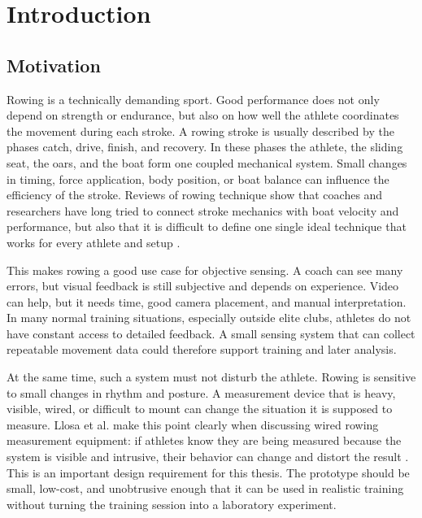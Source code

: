 \chapter{Introduction} %

\section{Motivation}

Rowing is a technically demanding sport. Good performance does not only depend on strength or endurance, but also on how well the athlete coordinates the movement during each stroke. A rowing stroke is usually described by the phases catch, drive, finish, and recovery. In these phases the athlete, the sliding seat, the oars, and the boat form one coupled mechanical system. Small changes in timing, force application, body position, or boat balance can influence the efficiency of the stroke. Reviews of rowing technique show that coaches and researchers have long tried to connect stroke mechanics with boat velocity and performance, but also that it is difficult to define one single ideal technique that works for every athlete and setup \cite{soper_towards_2004}.

This makes rowing a good use case for objective sensing. A coach can see many errors, but visual feedback is still subjective and depends on experience. Video can help, but it needs time, good camera placement, and manual interpretation. In many normal training situations, especially outside elite clubs, athletes do not have constant access to detailed feedback. A small sensing system that can collect repeatable movement data could therefore support training and later analysis.

At the same time, such a system must not disturb the athlete. Rowing is sensitive to small changes in rhythm and posture. A measurement device that is heavy, visible, wired, or difficult to mount can change the situation it is supposed to measure. Llosa et al. make this point clearly when discussing wired rowing measurement equipment: if athletes know they are being measured because the system is visible and intrusive, their behavior can change and distort the result \cite{llosa_remote_2009}. This is an important design requirement for this thesis. The prototype should be small, low-cost, and unobtrusive enough that it can be used in realistic training without turning the training session into a laboratory experiment.

